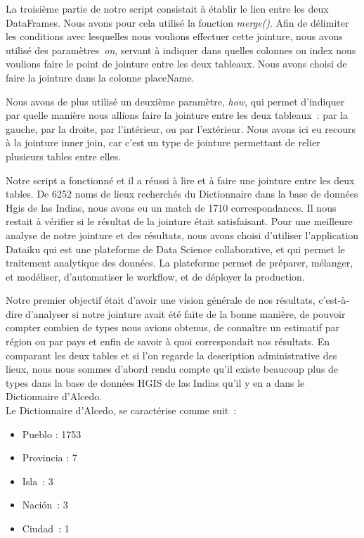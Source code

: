 \documentclass[a4paper,12pt,twoside]{book}
\begin{document}
La troisième partie de notre script consistait à établir le lien entre les deux DataFrames. Nous avons pour cela utilisé la fonction \textit{merge()}. Afin de délimiter les conditions avec lesquelles nous voulions effectuer cette jointure, nous avons utilisé des paramètres \textit{on}, servant à indiquer dans quelles colonnes ou index nous voulions faire le point de jointure entre les deux tableaux. Nous avons choisi de faire la jointure dans la colonne placeName.

Nous avons de plus utilisé un deuxième paramètre, \textit{how}, qui permet d’indiquer par quelle manière nous allions faire la jointure entre les deux tableaux : par la gauche, par la droite, par l’intérieur, ou par l’extérieur. Nous avons ici eu recours à la jointure inner join, car c’est un type de jointure permettant de relier plusieurs tables entre elles.

Notre script a fonctionné et il a réussi à lire et à faire une jointure entre les deux tables. De  6252 noms de lieux recherchés du Dictionnaire dans la base de données Hgis de las Indias, nous avons eu un match de 1710 correspondances. Il nous restait à vérifier si le résultat de la jointure était satisfaisant. Pour une meilleure analyse de notre jointure et des résultats, nous avons choisi d’utiliser l’application Dataiku qui est une plateforme de Data Science collaborative, et qui permet le traitement analytique des données. La plateforme permet de préparer, mélanger, et modéliser, d’automatiser le workflow, et de déployer la production.

Notre premier objectif était d’avoir une vision générale de nos résultats, c’est-à-dire d’analyser si notre jointure avait été faite de la bonne manière, de pouvoir compter combien de types nous avions obtenus, de connaître un estimatif par région ou par pays et enfin de savoir à quoi correspondait nos résultats. En comparant les deux tables et si l’on regarde la description administrative des lieux, nous nous sommes d’abord rendu compte qu’il existe beaucoup plus de types dans la base de données HGIS de las Indias qu’il y en a dans le Dictionnaire d’Alcedo. \\

	Le Dictionnaire d’Alcedo, se caractérise comme suit :\\
	
\begin{itemize}
\item Pueblo : 1753
\item Provincia : 7
\item Isla : 3
\item Nación : 3
\item Ciudad : 1\\
\end{itemize}
\end{document}
